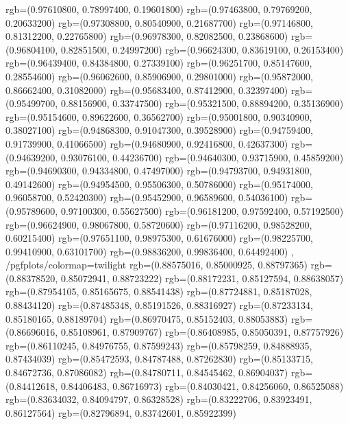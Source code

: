{{        rgb=(0.97610800, 0.78997400, 0.19601800)
        rgb=(0.97463800, 0.79769200, 0.20633200)
        rgb=(0.97308800, 0.80540900, 0.21687700)
        rgb=(0.97146800, 0.81312200, 0.22765800)
        rgb=(0.96978300, 0.82082500, 0.23868600)
        rgb=(0.96804100, 0.82851500, 0.24997200)
        rgb=(0.96624300, 0.83619100, 0.26153400)
        rgb=(0.96439400, 0.84384800, 0.27339100)
        rgb=(0.96251700, 0.85147600, 0.28554600)
        rgb=(0.96062600, 0.85906900, 0.29801000)
        rgb=(0.95872000, 0.86662400, 0.31082000)
        rgb=(0.95683400, 0.87412900, 0.32397400)
        rgb=(0.95499700, 0.88156900, 0.33747500)
        rgb=(0.95321500, 0.88894200, 0.35136900)
        rgb=(0.95154600, 0.89622600, 0.36562700)
        rgb=(0.95001800, 0.90340900, 0.38027100)
        rgb=(0.94868300, 0.91047300, 0.39528900)
        rgb=(0.94759400, 0.91739900, 0.41066500)
        rgb=(0.94680900, 0.92416800, 0.42637300)
        rgb=(0.94639200, 0.93076100, 0.44236700)
        rgb=(0.94640300, 0.93715900, 0.45859200)
        rgb=(0.94690300, 0.94334800, 0.47497000)
        rgb=(0.94793700, 0.94931800, 0.49142600)
        rgb=(0.94954500, 0.95506300, 0.50786000)
        rgb=(0.95174000, 0.96058700, 0.52420300)
        rgb=(0.95452900, 0.96589600, 0.54036100)
        rgb=(0.95789600, 0.97100300, 0.55627500)
        rgb=(0.96181200, 0.97592400, 0.57192500)
        rgb=(0.96624900, 0.98067800, 0.58720600)
        rgb=(0.97116200, 0.98528200, 0.60215400)
        rgb=(0.97651100, 0.98975300, 0.61676000)
        rgb=(0.98225700, 0.99410900, 0.63101700)
        rgb=(0.98836200, 0.99836400, 0.64492400)
    },
    /pgfplots/colormap={twilight}{
        rgb=(0.88575016, 0.85000925, 0.88797365)
        rgb=(0.88378520, 0.85072941, 0.88723222)
        rgb=(0.88172231, 0.85127594, 0.88638057)
        rgb=(0.87954105, 0.85165675, 0.88541438)
        rgb=(0.87724881, 0.85187028, 0.88434120)
        rgb=(0.87485348, 0.85191526, 0.88316927)
        rgb=(0.87233134, 0.85180165, 0.88189704)
        rgb=(0.86970475, 0.85152403, 0.88053883)
        rgb=(0.86696016, 0.85108961, 0.87909767)
        rgb=(0.86408985, 0.85050391, 0.87757926)
        rgb=(0.86110245, 0.84976755, 0.87599243)
        rgb=(0.85798259, 0.84888935, 0.87434039)
        rgb=(0.85472593, 0.84787488, 0.87262830)
        rgb=(0.85133715, 0.84672736, 0.87086082)
        rgb=(0.84780711, 0.84545462, 0.86904037)
        rgb=(0.84412618, 0.84406483, 0.86716973)
        rgb=(0.84030421, 0.84256060, 0.86525088)
        rgb=(0.83634032, 0.84094797, 0.86328528)
        rgb=(0.83222706, 0.83923491, 0.86127564)
        rgb=(0.82796894, 0.83742601, 0.85922399)
}}
